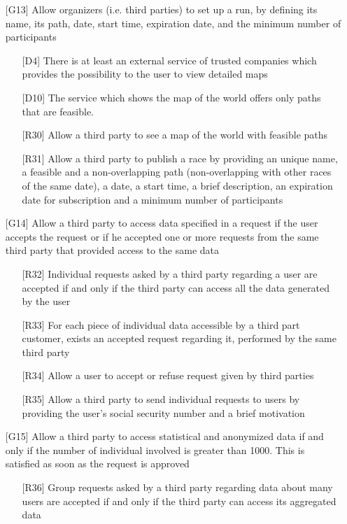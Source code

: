 \begin{itemize}
\begin{itemize}
	\end{itemize}
\item[{[G13]}] Allow organizers (i.e. third parties) to set up a run, by defining its name, its path, date, start time, expiration date, and the minimum number of participants
	\begin{itemize}
	\item[{[D4]}] There is at least an external service of trusted companies which provides the possibility to the user to view detailed maps
	\item[{[D10]}] The service which shows the map of the world offers only paths that are feasible.
	\item[{[R30]}] Allow a third party to see a map of the world with feasible paths
	\item[{[R31]}] Allow a third party to publish a race by providing an unique name, a feasible and a non-overlapping path (non-overlapping with other races of the same date), a date, a start time, a brief description, an expiration date for subscription and a minimum number of participants
	\end{itemize}
\item[{[G14]}] Allow a third party to access data specified in a request if the user accepts the request or if he accepted one or more requests from the same third party that provided access to the same data 
	\begin{itemize}
	\item[{[R32]}] Individual requests asked by a third party regarding a user are accepted if and only if the third party can access all the data generated by the user
	\item[{[R33]}] For each piece of individual data accessible by a third part customer, exists an accepted request regarding it, performed by the same third party 
	\item[{[R34]}] Allow a user to accept or refuse request given by third parties
	\item[{[R35]}] Allow a third party to send individual requests to users by providing the user's social security number and a brief motivation
	\end{itemize}
\item[{[G15]}] Allow a third party to access statistical and anonymized data if and only if the number of individual involved is greater than 1000. This is satisfied as soon as the request is approved  
	\begin{itemize}
	\item[{[R36]}] Group requests asked by a third party regarding data about many users are accepted if and only if the third party can access its aggregated data

\end{itemize}
\end{itemize}
